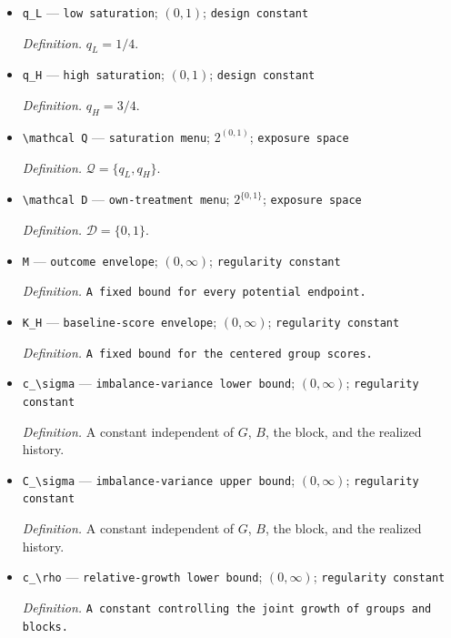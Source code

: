 \documentclass{article}
\begin{document}
\begin{itemize}
  \item \texttt{q\_\allowbreak{}L} --- \texttt{low saturation}; \((0,1)\); \texttt{design constant}
  \par\smallskip\noindent\emph{Definition.} \(q_L=1/4\).
  \item \texttt{q\_\allowbreak{}H} --- \texttt{high saturation}; \((0,1)\); \texttt{design constant}
  \par\smallskip\noindent\emph{Definition.} \(q_H=3/4\).
  \item \texttt{\textbackslash{}\allowbreak{}mathcal Q} --- \texttt{saturation menu}; \(2^{(0,1)}\); \texttt{exposure space}
  \par\smallskip\noindent\emph{Definition.} \(\mathcal Q=\{q_L,q_H\}\).
  \item \texttt{\textbackslash{}\allowbreak{}mathcal D} --- \texttt{own-\allowbreak{}treatment menu}; \(2^{\{0,1\}}\); \texttt{exposure space}
  \par\smallskip\noindent\emph{Definition.} \(\mathcal D=\{0,1\}\).
  \item \texttt{M} --- \texttt{outcome envelope}; \((0,\infty)\); \texttt{regularity constant}
  \par\smallskip\noindent\emph{Definition.} \texttt{A fixed bound for every potential endpoint.}
  \item \texttt{K\_\allowbreak{}H} --- \texttt{baseline-\allowbreak{}score envelope}; \((0,\infty)\); \texttt{regularity constant}
  \par\smallskip\noindent\emph{Definition.} \texttt{A fixed bound for the centered group scores.}
  \item \texttt{c\_\allowbreak{}\textbackslash{}\allowbreak{}sigma} --- \texttt{imbalance-\allowbreak{}variance lower bound}; \((0,\infty)\); \texttt{regularity constant}
  \par\smallskip\noindent\emph{Definition.} A constant independent of \(G\), \(B\), the block, and the realized history.
  \item \texttt{C\_\allowbreak{}\textbackslash{}\allowbreak{}sigma} --- \texttt{imbalance-\allowbreak{}variance upper bound}; \((0,\infty)\); \texttt{regularity constant}
  \par\smallskip\noindent\emph{Definition.} A constant independent of \(G\), \(B\), the block, and the realized history.
  \item \texttt{c\_\allowbreak{}\textbackslash{}\allowbreak{}rho} --- \texttt{relative-\allowbreak{}growth lower bound}; \((0,\infty)\); \texttt{regularity constant}
  \par\smallskip\noindent\emph{Definition.} \texttt{A constant controlling the joint growth of groups and blocks.}

\end{itemize}
\end{document}
